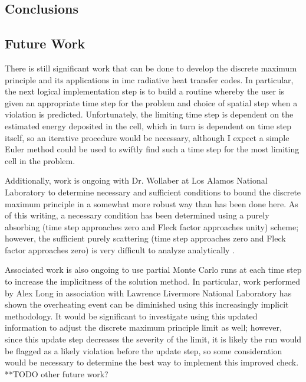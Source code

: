 
\begin{center}
\section{Conclusions}
\label{sec:Results}
\end{center}
\aboveSubSecSkip



\subsection{Future Work}
There is still significant work that can be done to develop the discrete maximum principle and its applications in \gls{imc} radiative heat transfer codes.  In particular, the next logical implementation step is to build a routine whereby the user is given an appropriate time step for the problem and choice of spatial step when a violation is predicted.  Unfortunately, the limiting time step is dependent on the estimated energy deposited in the cell, which in turn is dependent on time step itself, so an iterative procedure would be necessary, although I expect a simple Euler method could be used to swiftly find such a time step for the most limiting cell in the problem.  

Additionally, work is ongoing with Dr. Wollaber at Los Alamos National Laboratory to determine necessary and sufficient conditions to bound the discrete maximum principle in a somewhat more robust way than has been done here.  As of this writing, a necessary condition has been determined using a purely absorbing (time step approaches zero and Fleck factor approaches unity) scheme; however, the sufficient purely scattering (time step approaches zero and Fleck factor approaches zero) is very difficult to analyze analytically \cite{TODO}.

Associated work is also ongoing to use partial Monte Carlo runs at each time step to increase the implicitness of the solution method.  In particular, work performed by Alex Long in association with Lawrence Livermore National Laboratory has shown the overheating event can be diminished using this increasingly implicit methodology.  It would be significant to investigate using this updated information to adjust the discrete maximum principle limit as well; however, since this update step decreases the severity of the limit, it is likely the run would be flagged as a likely violation before the update step, so some consideration would be necessary to determine the best way to implement this improved check.
\\ **TODO other future work? %